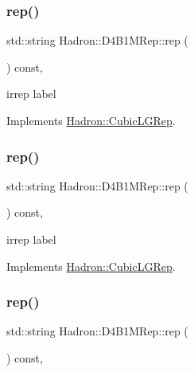 \subsubsection{\texorpdfstring{rep()}{rep()}\hspace{0.1cm}{\footnotesize\ttfamily [1/3]}}
{\footnotesize\ttfamily std\+::string Hadron\+::\+D4\+B1\+M\+Rep\+::rep (\begin{DoxyParamCaption}{ }\end{DoxyParamCaption}) const\hspace{0.3cm}{\ttfamily [inline]}, {\ttfamily [virtual]}}

irrep label 

Implements \mbox{\hyperlink{structHadron_1_1CubicLGRep_a50f5ddbb8f4be4cee0106fa9e8c75e6c}{Hadron\+::\+Cubic\+L\+G\+Rep}}.

\mbox{\label{structHadron_1_1D4B1MRep_a8bcd49be46064fc4ee93c98a36a3da8d}} 
\subsubsection{\texorpdfstring{rep()}{rep()}\hspace{0.1cm}{\footnotesize\ttfamily [2/3]}}
{\footnotesize\ttfamily std\+::string Hadron\+::\+D4\+B1\+M\+Rep\+::rep (\begin{DoxyParamCaption}{ }\end{DoxyParamCaption}) const\hspace{0.3cm}{\ttfamily [inline]}, {\ttfamily [virtual]}}

irrep label 

Implements \mbox{\hyperlink{structHadron_1_1CubicLGRep_a50f5ddbb8f4be4cee0106fa9e8c75e6c}{Hadron\+::\+Cubic\+L\+G\+Rep}}.

\mbox{\label{structHadron_1_1D4B1MRep_a8bcd49be46064fc4ee93c98a36a3da8d}} 
\subsubsection{\texorpdfstring{rep()}{rep()}\hspace{0.1cm}{\footnotesize\ttfamily [3/3]}}
{\footnotesize\ttfamily std\+::string Hadron\+::\+D4\+B1\+M\+Rep\+::rep (\begin{DoxyParamCaption}{ }\end{DoxyParamCaption}) const\hspace{0.3cm}{\ttfamily [inline]}, {\ttfamily [virtual]}}

